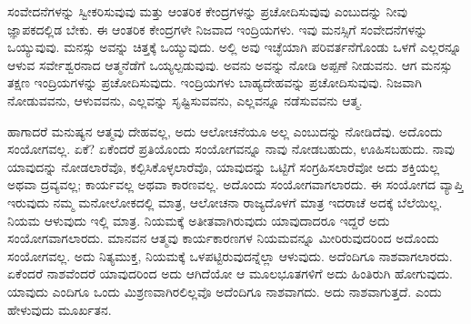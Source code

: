 ಸಂವೇದನೆಗಳನ್ನು ಸ್ವೀಕರಿಸುವುವು ಮತ್ತು ಆಂತರಿಕ ಕೇಂದ್ರಗಳನ್ನು ಪ್ರಚೋದಿಸುವುವು ಎಂಬುದನ್ನು ನೀವು ಜ್ಞಾಪಕದಲ್ಲಿಡ ಬೇಕು. ಈ ಆಂತರಿಕ ಕೇಂದ್ರಗಳೇ ನಿಜವಾದ ಇಂದ್ರಿಯಗಳು. ಇವು ಮನಸ್ಸಿಗೆ ಸಂವೇದನೆಗಳನ್ನು ಒಯ್ಯುವುವು. ಮನಸ್ಸು ಅವನ್ನು ಚಿತ್ತಕ್ಕೆ ಒಯ್ಯುವುದು. ಅಲ್ಲಿ ಅವು ಇಚ್ಛೆಯಾಗಿ ಪರಿವರ್ತನೆಗೊಂಡು ಒಳಗೆ ಎಲ್ಲರನ್ನೂ ಆಳುವ ಸರ್ವೇಶ್ವರನಾದ ಆತ್ಮನೆಡೆಗೆ ಒಯ್ಯಲ್ಪಡುವುವು. ಅವನು ಅವನ್ನು ನೋಡಿ ಅಪ್ಪಣೆ ನೀಡುವನು. ಆಗ ಮನಸ್ಸು ತಕ್ಷಣ ಇಂದ್ರಿಯಗಳನ್ನು ಪ್ರಚೋದಿಸುವುದು. ಇಂದ್ರಿಯಗಳು ಬಾಹ್ಯದೇಹವನ್ನು ಪ್ರಚೋದಿಸುವುವು. ನಿಜವಾಗಿ ನೋಡುವವನು, ಆಳುವವನು, ಎಲ್ಲವನ್ನು ಸೃಷ್ಟಿಸುವವನು, ಎಲ್ಲವನ್ನೂ ನಡೆಸುವವನು ಆತ್ಮ.

ಹಾಗಾದರೆ ಮನುಷ್ಯನ ಆತ್ಮವು ದೇಹವಲ್ಲ, ಅದು ಆಲೋಚನೆಯೂ ಅಲ್ಲ ಎಂಬುದನ್ನು ನೋಡಿದೆವು. ಅದೊಂದು ಸಂಯೋಗವಲ್ಲ. ಏಕೆ? ಏಕೆಂದರೆ ಪ್ರತಿಯೊಂದು ಸಂಯೋಗವನ್ನೂ ನಾವು ನೋಡಬಹುದು, ಊಹಿಸಬಹುದು. ನಾವು ಯಾವುದನ್ನು ನೋಡಲಾರೆವೊ, ಕಲ್ಪಿಸಿಕೊಳ್ಳಲಾರೆವೊ, ಯಾವುದನ್ನು ಒಟ್ಟಿಗೆ ಸಂಗ್ರಹಿಸಲಾರೆವೋ ಅದು ಶಕ್ತಿಯಲ್ಲ ಅಥವಾ ದ್ರವ್ಯವಲ್ಲ; ಕಾರ್ಯವಲ್ಲ ಅಥವಾ ಕಾರಣವಲ್ಲ. ಅದೊಂದು ಸಂಯೋಗವಾಗಲಾರದು. ಈ ಸಂಯೋಗದ ವ್ಯಾಪ್ತಿ ಇರುವುದು ನಮ್ಮ ಮನೋಲೋಕದಲ್ಲಿ ಮಾತ್ರ, ಆಲೋಚನಾ ರಾಜ್ಯದೊಳಗೆ ಮಾತ್ರ ಇದರಾಚೆ ಅದಕ್ಕೆ ಬೆಲೆಯಿಲ್ಲ. ನಿಯಮ ಆಳುವುದು ಇಲ್ಲಿ ಮಾತ್ರ. ನಿಯಮಕ್ಕೆ ಅತೀತವಾಗಿರುವುದು ಯಾವುದಾದರೂ ಇದ್ದರೆ ಅದು ಸಂಯೋಗವಾಗಲಾರದು. ಮಾನವನ ಆತ್ಮವು ಕಾರ್ಯಕಾರಣಗಳ ನಿಯಮವನ್ನೂ ಮೀರಿರುವುದರಿಂದ ಅದೊಂದು ಸಂಯೋಗವಲ್ಲ. ಅದು ನಿತ್ಯಮುಕ್ತ, ನಿಯಮಕ್ಕೆ ಒಳಪಟ್ಟಿರುವುದನ್ನೆಲ್ಲಾ ಆಳುವುದು. ಅದೆಂದಿಗೂ ನಾಶವಾಗಲಾರದು. ಏಕೆಂದರೆ ನಾಶವೆಂದರೆ ಯಾವುದರಿಂದ ಅದು ಆಗಿದೆಯೋ ಆ ಮೂಲಭೂತಗಳಿಗೆ ಅದು ಹಿಂತಿರುಗಿ ಹೋಗುವುದು. ಯಾವುದು ಎಂದಿಗೂ ಒಂದು ಮಿಶ್ರಣವಾಗಿರಲಿಲ್ಲವೊ ಅದೆಂದಿಗೂ ನಾಶವಾಗದು. ಅದು ನಾಶವಾಗುತ್ತದೆ. ಎಂದು ಹೇಳುವುದು ಮೂರ್ಖತನ.

